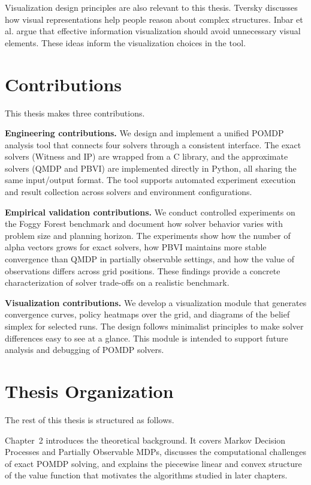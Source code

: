 Visualization design principles are also relevant to this thesis.
Tversky \cite{tverskyVisualizingThoughtMapping} discusses how visual representations help people reason about complex structures.
Inbar et al. \cite{inbarMinimalismInformationVisualization2007} argue that effective information visualization should avoid unnecessary visual elements.
These ideas inform the visualization choices in the tool.


\section{Contributions}

This thesis makes three contributions.

\textbf{Engineering contributions.}
We design and implement a unified POMDP analysis tool that connects four solvers through a consistent interface.
The exact solvers (Witness and IP) are wrapped from a C library, and the approximate solvers (QMDP and PBVI) are implemented directly in Python, all sharing the same input/output format.
The tool supports automated experiment execution and result collection across solvers and environment configurations.

\textbf{Empirical validation contributions.}
We conduct controlled experiments on the Foggy Forest benchmark and document how solver behavior varies with problem size and planning horizon.
The experiments show how the number of alpha vectors grows for exact solvers, how PBVI maintains more stable convergence than QMDP in partially observable settings, and how the value of observations differs across grid positions.
These findings provide a concrete characterization of solver trade-offs on a realistic benchmark.

\textbf{Visualization contributions.}
We develop a visualization module that generates convergence curves, policy heatmaps over the grid, and diagrams of the belief simplex for selected runs.
The design follows minimalist principles to make solver differences easy to see at a glance.
This module is intended to support future analysis and debugging of POMDP solvers.


\section{Thesis Organization}

The rest of this thesis is structured as follows.

Chapter~2 introduces the theoretical background.
It covers Markov Decision Processes and Partially Observable MDPs, discusses the computational challenges of exact POMDP solving, and explains the piecewise linear and convex structure of the value function that motivates the algorithms studied in later chapters.

